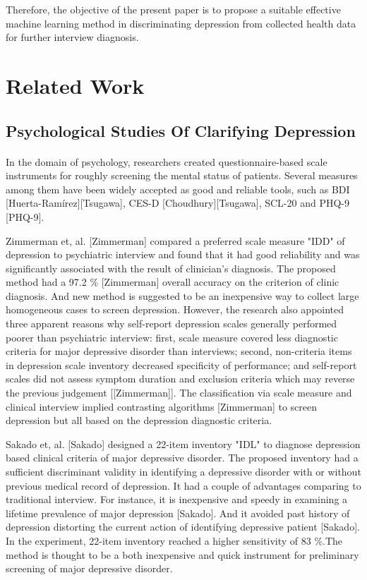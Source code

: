 \documentclass[runningheads]{llncs}
\begin{document}
Therefore, the objective of the present paper is to propose a suitable effective machine learning method in discriminating depression from collected health data for further interview diagnosis. 
%
%         
%
%
%
\pagebreak
\section{Related Work}
\subsection{Psychological Studies Of Clarifying Depression}
% 
%
\paragraph{}
In the domain of psychology, researchers created questionnaire-based scale instruments for roughly screening the mental status of patients. Several measures among them have been widely accepted as good and reliable tools, such as BDI [Huerta-Ramírez][Tsugawa], CES-D [Choudhury][Tsugawa], SCL-20 and PHQ-9 [PHQ-9]. 

Zimmerman et, al. [Zimmerman] compared a preferred scale measure "IDD" of depression to psychiatric interview and found that it had good reliability and was significantly associated with the result of clinician's diagnosis. The proposed method had a 97.2 \% [Zimmerman] overall accuracy on the criterion of clinic diagnosis. And new method is suggested to be an inexpensive way to collect large homogeneous cases to screen depression. However, the research also appointed three apparent reasons why self-report depression scales generally performed poorer than psychiatric interview: first, scale measure covered less diagnostic criteria for major depressive disorder than interviews; second, non-criteria items in depression scale inventory decreased specificity of performance; and self-report scales did not assess symptom duration and exclusion criteria which may reverse the previous judgement [[Zimmerman]]. The classification via scale measure and clinical interview implied contrasting algorithms [Zimmerman] to screen depression but all based on the depression diagnostic criteria. 

Sakado et, al. [Sakado] designed a 22-item inventory "IDL" to diagnose depression based clinical criteria of major depressive disorder. The proposed inventory had a sufficient discriminant validity in identifying a depressive disorder with or without previous medical record of depression. It had a couple of advantages comparing to traditional interview. For instance, it is inexpensive and speedy in examining a lifetime prevalence of major depression [Sakado]. And it avoided past history of depression distorting the current action of identifying depressive patient [Sakado]. In the experiment, 22-item inventory reached a higher sensitivity of 83 \%.The method is thought to be a both inexpensive and quick instrument for preliminary screening of major depressive disorder. 
\end{document}

